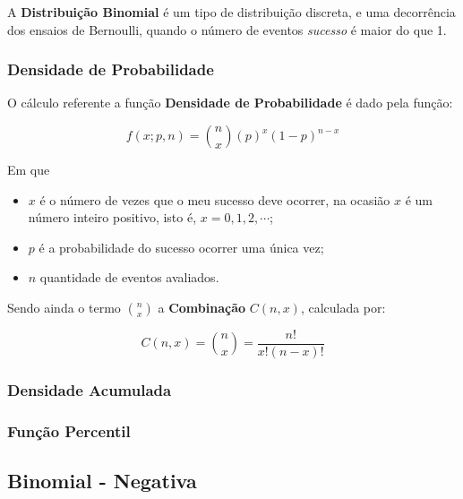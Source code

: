 \documentclass[
]{book}
\begin{document}
A \textbf{Distribuição Binomial} é um tipo de distribuição discreta, e uma decorrência dos ensaios de Bernoulli, quando o número de eventos \emph{sucesso} é maior do que 1.

\hypertarget{densidade-de-probabilidade-2}{%
\subsubsection*{Densidade de Probabilidade}\label{densidade-de-probabilidade-2}}

O cálculo referente a função \textbf{Densidade de Probabilidade} é dado pela função:

\begin{equation}
  f(x;p,n) = \binom{n}{x} (p)^x (1-p)^{n-x} 
\end{equation}

Em que

\begin{itemize}
\item
  \(x\) é o número de vezes que o meu sucesso deve ocorrer, na ocasião \(x\) é um número inteiro positivo, isto é, \(x = 0, 1, 2, \cdots\);
\item
  \(p\) é a probabilidade do sucesso ocorrer uma única vez;
\item
  \(n\) quantidade de eventos avaliados.
\end{itemize}

Sendo ainda o termo \(\binom{n}{x}\) a \textbf{Combinação} \(C(n,x)\), calculada por:

\[
 C(n,x) = \binom{n}{x} = \frac{n!}{x!(n-x)!}
\]

\hypertarget{densidade-acumulada-2}{%
\subsubsection*{Densidade Acumulada}\label{densidade-acumulada-2}}

\hypertarget{funuxe7uxe3o-percentil-2}{%
\subsubsection*{Função Percentil}\label{funuxe7uxe3o-percentil-2}}

\hypertarget{binomial---negativa}{%
\subsection{Binomial - Negativa}\label{binomial---negativa}}
\end{document}
